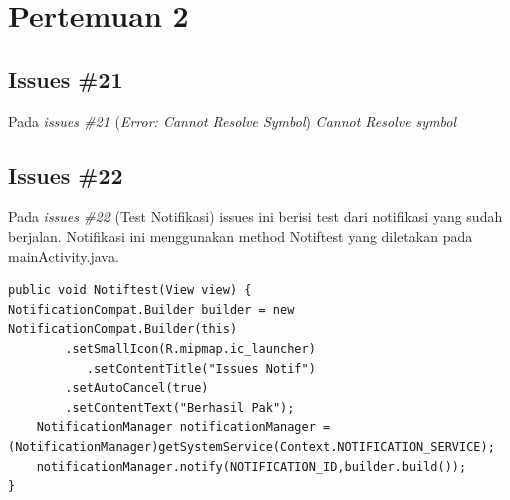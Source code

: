 \chapter{Pertemuan 2}


\section{Issues \#21}
Pada \textit{issues \#21} (\textit{Error: Cannot Resolve Symbol}) \textit{Cannot Resolve symbol} 

\section{Issues \#22}
Pada \textit{issues \#22} (Test Notifikasi) issues ini berisi test dari notifikasi yang sudah berjalan. Notifikasi ini menggunakan method Notiftest yang diletakan pada mainActivity.java.
\begin{verbatim}
public void Notiftest(View view) {
NotificationCompat.Builder builder = new NotificationCompat.Builder(this)
        .setSmallIcon(R.mipmap.ic_launcher)
           .setContentTitle("Issues Notif")
        .setAutoCancel(true)
        .setContentText("Berhasil Pak");
    NotificationManager notificationManager = (NotificationManager)getSystemService(Context.NOTIFICATION_SERVICE);
    notificationManager.notify(NOTIFICATION_ID,builder.build());
}
\end{verbatim}

